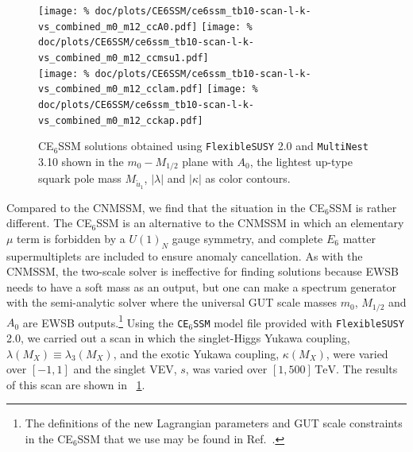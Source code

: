 \documentclass[final,3p,11pt,pdflatex]{elsarticle}
\makeatletter
\newcommand{\modelname}[1]{\texttt{#1}\@\xspace}
\newcommand{\fs}{\texttt{FlexibleSUSY}\@\xspace}
\newcommand{\multinest}{\texttt{MultiNest}\@\xspace}
\newcommand{\fstwo}{\fs 2.0\@\xspace}
\newcommand{\ESSM}{E$_6$SSM\@\xspace}
\newcommand{\unit}[1]{\,\text{#1}}      %
\newcommand{\figref}[1]{\figurename~\ref{#1}}
\newcommand{\azero}{\ensuremath{A_0}\xspace}
\newcommand{\mhalf}{\ensuremath{M_{1/2}}\xspace}
\newcommand{\mzero}{\ensuremath{m_0}\xspace}
\makeatother
\begin{document}
\begin{figure}[tbh]
  \centering
  \texttt{[image: \%
     doc/plots/CE6SSM/ce6ssm\_tb10-scan-l-k-vs\_combined\_m0\_m12\_ccA0.pdf]}
   \texttt{[image: \%
     doc/plots/CE6SSM/ce6ssm\_tb10-scan-l-k-vs\_combined\_m0\_m12\_ccmsu1.pdf]} \\
  \texttt{[image: \%
    doc/plots/CE6SSM/ce6ssm\_tb10-scan-l-k-vs\_combined\_m0\_m12\_cclam.pdf]}
   \texttt{[image: \%
    doc/plots/CE6SSM/ce6ssm\_tb10-scan-l-k-vs\_combined\_m0\_m12\_cckap.pdf]}
   \caption{C\ESSM solutions obtained using \fstwo and \multinest 3.10 shown in
     the $\mzero-\mhalf$ plane with $\azero$, the lightest up-type squark pole mass
     $M_{\tilde{u}_1}$,  $|\lambda|$ and $|\kappa|$ as color contours.}
  \label{fig:ce6ssm_solutions}
\end{figure}

Compared to the CNMSSM, we find that the situation in the C\ESSM is rather
different.  The C\ESSM is an alternative to the CNMSSM in which an elementary
$\mu$ term is forbidden by a $U(1)_N$ gauge symmetry, and complete $E_6$ matter
supermultiplets are included to ensure anomaly cancellation.  As with the
CNMSSM, the two-scale solver is ineffective for finding solutions because EWSB
needs to have a soft mass as an output, but one can make a spectrum generator
with the semi-analytic solver where the universal GUT scale masses $\mzero$,
$\mhalf$ and $\azero$ are EWSB outputs.\footnote{The definitions of the
  new Lagrangian parameters and GUT scale constraints in the C\ESSM that we
  use may be found in Ref.~\cite{Athron:2009bs}.}  Using the \modelname{C\ESSM}
model file provided with \fstwo, we carried out a scan in which the
singlet-Higgs Yukawa coupling, $\lambda(M_X) \equiv \lambda_3(M_X)$, and the
exotic Yukawa coupling, $\kappa(M_X)$, were varied over $[-1,1]$ and the singlet
VEV, $s$, was varied over $[1,500] \unit{TeV}$.  The results of this scan are
shown in \figref{fig:ce6ssm_solutions}.
\end{document}
